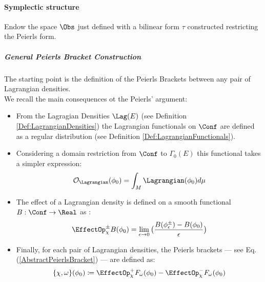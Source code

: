 \documentclass[Main]{subfiles}
\begin{document}
		\paragraph{Symplectic structure}
			Endow the space $\Obs$ just defined with a bilinear form $\tau$ constructed restricting the Peierls form.
			\subparagraph{General Peierls Bracket Construction}
			The starting point is the definition of the Peierls Brackets between any pair of Lagrangian densities.
			\\
				We recall the main consequences  ot the Peierls' argument:
				\begin{itemize}
					\item From the Lagragian Densities $\Lag(E)$ (see Definition  \ref{Def:LagrangianDensities}) %
					the Lagrangian functionals on $\Conf$ are defined as a regular distribution (see Definition \ref{Def:LagrangianFunctionals}).

					\item Considering a domain restriction from $\Conf$ to $\Gamma_0(E)$  this functional takes a simpler expression:
					\begin{displaymath}
						\mathcal{O}_\Lagrangian( \phi_0) = \int_M \Lagrangian(\phi_0) d\mu
					\end{displaymath}
					\item The effect of  a Lagrangian density  is defined on a smooth functional $B: \Conf \rightarrow \Real$ as :
						\begin{displaymath}
							\EffectOp_\chi^\pm B (\phi_0) = \lim_{\epsilon\rightarrow 0} \big( \frac{B(\phi_\epsilon^\pm) - B (\phi_0)} {\epsilon} \big)
						\end{displaymath}
					\item Finally, for each pair of Lagrangian densities, the Peierls brackets --- see Eq. (\ref{AbstractPeierlsBracket}) --- are defined as:
						\begin{displaymath}
							\{\chi, \omega \}(\phi_0) \coloneqq \EffectOp_\chi^+ F_\omega (\phi_0) - \EffectOp_\chi^- F_\omega(\phi_0)
						\end{displaymath}
				\end{itemize}				 
		
\end{document}
